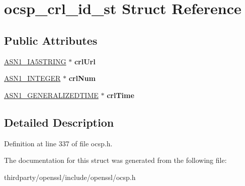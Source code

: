 \hypertarget{structocsp__crl__id__st}{}\section{ocsp\+\_\+crl\+\_\+id\+\_\+st Struct Reference}
\label{structocsp__crl__id__st}
\subsection*{Public Attributes}
\begin{DoxyCompactItemize}
\item 
\mbox{\label{structocsp__crl__id__st_a1054ab5bca3c14bd95723caf35a02dc7}} 
\hyperlink{structasn1__string__st}{A\+S\+N1\+\_\+\+I\+A5\+S\+T\+R\+I\+NG} $\ast$ {\bfseries crl\+Url}
\item 
\mbox{\label{structocsp__crl__id__st_a65c4311de0c943b5e162c7ce6091b74e}} 
\hyperlink{structasn1__string__st}{A\+S\+N1\+\_\+\+I\+N\+T\+E\+G\+ER} $\ast$ {\bfseries crl\+Num}
\item 
\mbox{\label{structocsp__crl__id__st_ac837981de065fbf9415d54739fedc2f5}} 
\hyperlink{structasn1__string__st}{A\+S\+N1\+\_\+\+G\+E\+N\+E\+R\+A\+L\+I\+Z\+E\+D\+T\+I\+ME} $\ast$ {\bfseries crl\+Time}
\end{DoxyCompactItemize}


\subsection{Detailed Description}


Definition at line 337 of file ocsp.\+h.



The documentation for this struct was generated from the following file\+:\begin{DoxyCompactItemize}
\item 
thirdparty/openssl/include/openssl/ocsp.\+h\end{DoxyCompactItemize}
